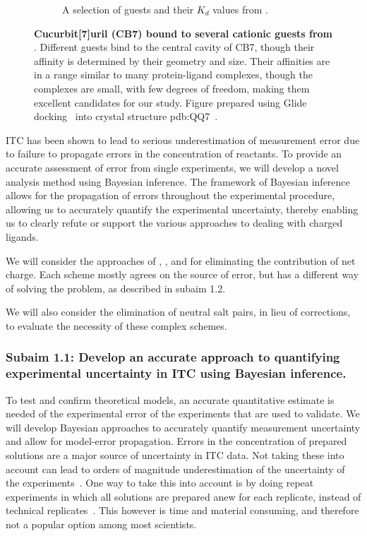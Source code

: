 \documentclass[10pt,final]{article}
\begin{document}
\begin{figure}[H]
\begin{subfigure}{.5\textwidth}
  \caption{A selection of guests and their $K_d$ values from \textcite{Cao2013a}.}
  \label{fig:sub2}
\end{subfigure}
\caption{\textbf{Cucurbit[7]uril (CB7) bound to several cationic guests from \textcite{Cao2013a}}. Different guests bind to the central cavity of CB7, though their affinity is determined by their geometry and size. Their affinities are in a range similar to many protein-ligand complexes, though the complexes are small, with few degrees of freedom, making them excellent candidates for our study. Figure prepared using Glide docking~\autocite{Halgren2004a,Friesner2004a,Friesner2006a,Schroedinger2014a} into crystal structure pdb:QQ7~\autocite{Feng2004a}.}
\label{figure:host-guest}
\end{figure}

ITC has been shown to lead to serious underestimation of measurement error due to failure to propagate errors in the concentration of reactants\autocite{Myszka2003a,Tellinghuisen2011a}. To provide an accurate assessment of error from single experiments, we will develop a novel analysis method using Bayesian inference.
%
The framework of Bayesian inference allows for the propagation of errors throughout the experimental procedure, allowing us to accurately quantify the experimental uncertainty, thereby enabling us to clearly refute or support the various approaches to dealing with charged ligands.

We will consider the approaches of \textcite{Reif2013a}, \textcite{Rocklin2013a}, and \textcite{Lin2014a} for eliminating the contribution of net charge.  Each scheme mostly agrees on the source of error, but has a different way of solving the problem, as described in subaim 1.2. 

We will also consider the elimination of neutral salt pairs, in lieu of corrections, to evaluate the necessity of these complex schemes.


\subsubsection*{Subaim 1.1: Develop an accurate approach to quantifying experimental uncertainty in ITC using Bayesian inference.}
To test and confirm theoretical models, an accurate quantitative estimate is needed of the experimental error of the experiments that are used to validate.
%
We will develop Bayesian approaches to accurately quantify measurement uncertainty and allow for model-error propagation. 
Errors in the concentration of prepared solutions are a major source of uncertainty in ITC data. Not taking these into account can lead to orders of magnitude underestimation of the uncertainty of the experiments~\autocite{Myszka2003a,Tellinghuisen2011a}.
One way to take this into account is by doing repeat experiments in which all solutions are prepared anew for each replicate, instead of technical replicates~\autocite{Vaux2012a}. This however is time and material consuming, and therefore not a popular option among most scientists. 
\end{document}
